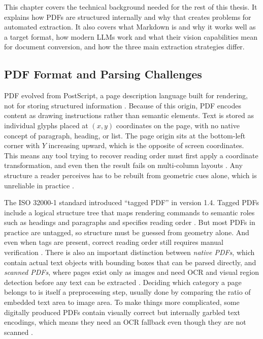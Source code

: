 \documentclass[12pt]{article}
\begin{document}
This chapter covers the technical background needed for the rest of this thesis. It explains how PDFs are structured internally and why that creates problems for automated extraction. It also covers what Markdown is and why it works well as a target format, how modern LLMs work and what their vision capabilities mean for document conversion, and how the three main extraction strategies differ.

\subsection{PDF Format and Parsing Challenges}

PDF evolved from PostScript, a page description language built for rendering,
not for storing structured information \cite{whitington2012}. Because of this
origin, PDF encodes content as drawing instructions rather than semantic
elements. Text is stored as individual glyphs placed at $(x, y)$ coordinates
on the page, with no native concept of paragraph, heading, or list. The page
origin sits at the bottom-left corner with $Y$ increasing upward, which is the
opposite of screen coordinates. This means any tool trying to recover reading
order must first apply a coordinate transformation, and even then the result
fails on multi-column layouts \cite{whitington2012}. Any structure a reader
perceives has to be rebuilt from geometric cues alone, which is unreliable in
practice \cite{gao2011}.

The ISO 32000-1 standard introduced ``tagged PDF'' in version 1.4. Tagged PDFs
include a logical structure tree that maps rendering commands to semantic roles
such as headings and paragraphs and specifies reading order
\cite{darvishy2018}. But most PDFs in practice are untagged, so structure must
be guessed from geometry alone. And even when tags are present, correct reading
order still requires manual verification \cite{darvishy2018}. There is also an
important distinction between \textit{native PDFs}, which contain actual text
objects with bounding boxes that can be parsed directly, and \textit{scanned
PDFs}, where pages exist only as images and need OCR and visual region detection
before any text can be extracted \cite{whitington2012}. Deciding which category a
page belongs to is itself a preprocessing step, usually done by comparing the
ratio of embedded text area to image area. To make things more complicated,
some digitally produced PDFs contain visually correct but internally garbled
text encodings, which means they need an OCR fallback even though they are not
scanned \cite{whitington2012}.
\end{document}
